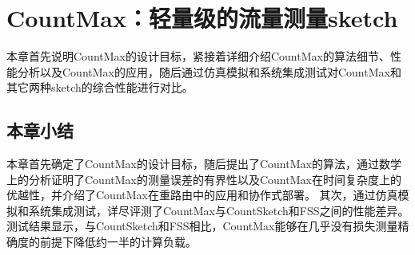 % 

\chapter{CountMax：轻量级的流量测量sketch}\label{chap:countmax}
本章首先说明CountMax的设计目标，紧接着详细介绍CountMax的算法细节、性能分析以及CountMax的应用，随后通过仿真模拟和系统集成测试对CountMax和其它两种sketch的综合性能进行对比。





\section{本章小结}
本章首先确定了CountMax的设计目标，随后提出了CountMax的算法，通过数学上的分析证明了CountMax的测量误差的有界性以及CountMax在时间复杂度上的优越性，并介绍了CountMax在重路由中的应用和协作式部署。
其次，通过仿真模拟和系统集成测试，详尽评测了CountMax与CountSketch和FSS之间的性能差异。
测试结果显示，与CountSketch和FSS相比，CountMax能够在几乎没有损失测量精确度的前提下降低约一半的计算负载。